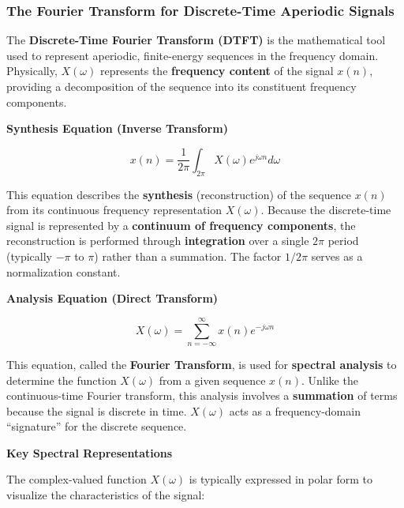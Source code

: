 \hypertarget{the-fourier-transform-for-discrete-time-aperiodic-signals}{%
\subsubsection{The Fourier Transform for Discrete-Time Aperiodic
Signals}\label{the-fourier-transform-for-discrete-time-aperiodic-signals}}

The \textbf{Discrete-Time Fourier Transform (DTFT)} is the mathematical
tool used to represent aperiodic, finite-energy sequences in the
frequency domain. Physically, \(X(\omega)\) represents the
\textbf{frequency content} of the signal \(x(n)\), providing a
decomposition of the sequence into its constituent frequency components.

\textbf{Synthesis Equation (Inverse Transform)}

\[x(n) = \frac{1}{2\pi} \int_{2\pi} X(\omega) e^{j\omega n} d\omega\]

This equation describes the \textbf{synthesis} (reconstruction) of the
sequence \(x(n)\) from its continuous frequency representation
\(X(\omega)\). Because the discrete-time signal is represented by a
\textbf{continuum of frequency components}, the reconstruction is
performed through \textbf{integration} over a single \(2\pi\) period
(typically \(-\pi\) to \(\pi\)) rather than a summation. The factor
\(1/2\pi\) serves as a normalization constant.

\textbf{Analysis Equation (Direct Transform)}

\[X(\omega) = \sum_{n=-\infty}^{\infty} x(n) e^{-j\omega n}\]

This equation, called the \textbf{Fourier Transform}, is used for
\textbf{spectral analysis} to determine the function \(X(\omega)\) from
a given sequence \(x(n)\). Unlike the continuous-time Fourier transform,
this analysis involves a \textbf{summation} of terms because the signal
is discrete in time. \(X(\omega)\) acts as a frequency-domain
``signature'' for the discrete sequence.

\textbf{Key Spectral Representations}

The complex-valued function \(X(\omega)\) is typically expressed in
polar form to visualize the characteristics of the signal:

